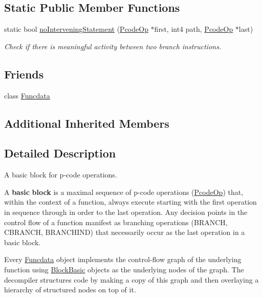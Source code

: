 \subsection*{Static Public Member Functions}
\begin{DoxyCompactItemize}
\item 
static bool \mbox{\hyperlink{class_block_basic_aa6121743b8e601f2eca7f396b413b35f}{no\+Intervening\+Statement}} (\mbox{\hyperlink{class_pcode_op}{Pcode\+Op}} $\ast$first, int4 path, \mbox{\hyperlink{class_pcode_op}{Pcode\+Op}} $\ast$last)
\begin{DoxyCompactList}\small\item\em Check if there is meaningful activity between two branch instructions. \end{DoxyCompactList}\end{DoxyCompactItemize}
\subsection*{Friends}
\begin{DoxyCompactItemize}
\item 
class \mbox{\hyperlink{class_block_basic_a16ade990887167c11c41cb88121bb449}{Funcdata}}
\end{DoxyCompactItemize}
\subsection*{Additional Inherited Members}


\subsection{Detailed Description}
A basic block for p-\/code operations. 

A {\bfseries{basic}} {\bfseries{block}} is a maximal sequence of p-\/code operations (\mbox{\hyperlink{class_pcode_op}{Pcode\+Op}}) that, within the context of a function, always execute starting with the first operation in sequence through in order to the last operation. Any decision points in the control flow of a function manifest as branching operations (B\+R\+A\+N\+CH, C\+B\+R\+A\+N\+CH, B\+R\+A\+N\+C\+H\+I\+ND) that necessarily occur as the last operation in a basic block.

Every \mbox{\hyperlink{class_funcdata}{Funcdata}} object implements the control-\/flow graph of the underlying function using \mbox{\hyperlink{class_block_basic}{Block\+Basic}} objects as the underlying nodes of the graph. The decompiler structures code by making a copy of this graph and then overlaying a hierarchy of structured nodes on top of it.

